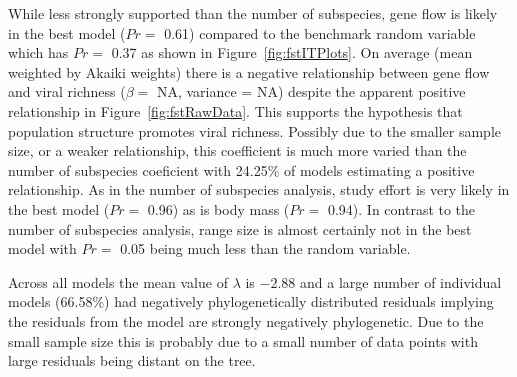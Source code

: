 
While less strongly supported than the number of subspecies, gene flow is likely in the best model ($Pr = $ 0.61) compared to the benchmark random variable which has $Pr = $ 0.37 as shown in Figure~\ref{fig:fstITPlots}.
On average (mean weighted by Akaiki weights) there is a negative relationship between gene flow and viral richness ($\beta = $ NA, variance = NA) despite the apparent positive relationship in Figure~\ref{fig:fstRawData}.
This supports the hypothesis that population structure promotes viral richness.
Possibly due to the smaller sample size, or a weaker relationship, this coefficient is much more varied than the number of subspecies coeficient with 24.25\% of models estimating a positive relationship.
As in the number of subspecies analysis, study effort is very likely in the best model ($Pr = $ 0.96) as is body mass ($Pr = $ 0.94).
In contrast to the number of subspecies analysis, range size is almost certainly not in the best model with $Pr = $ 0.05 being much less than the random variable.

Across all models the mean value of $\lambda$ is \ensuremath{-2.88} and a large number of individual models (66.58\%)  had negatively phylogenetically distributed residuals implying the residuals from the model are strongly negatively phylogenetic.
Due to the small sample size this is probably due to a small number of data points with large residuals being distant on the tree.
















